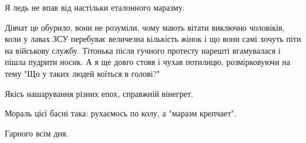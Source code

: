 Я ледь не впав від настільки еталонного маразму.

Дівчат це обурило, вони не розуміли, чому мають вітати виключно чоловіків, коли
у лавах ЗСУ перебуває величезна кількість жінок і що вони самі хочуть піти на
військову службу. Тітонька після гучного протесту нарешті вгамувалася і пішла
пудрити носик. А я ще довго стояв і чухав потилицю, розмірковуючи на тему "Що у
таких людей коїться в голові?"

Якісь нашарування різних епох, справжній вінегрет.

Мораль цієї басні така: рухаємось по колу, а "маразм крепчает".

Гарного всім дня.

